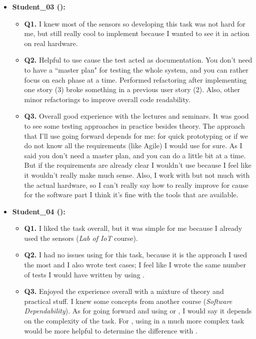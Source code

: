 \begin{itemize}
    \item \textbf{Student\_03 (\tdd):}
    \begin{itemize}
        \item \textbf{Q1.} I knew most of the sensors so developing this task was not hard for me, but still really cool to implement because I wanted to see it in action on real hardware.
        \item \textbf{Q2.} Helpful to use \tdd cause the test acted as documentation. You don't need to have a ``master plan" for testing the whole system, and you can rather focus on each phase at a time. Performed refactoring after implementing one story (3) broke something in a previous user story (2). Also, other minor refactorings to improve overall code readability.
        \item \textbf{Q3.} Overall good experience with the lectures and seminars. It was good to see some testing approaches in practice besides theory. The approach that I'll use going forward depends for me: for quick prototyping or if we do not know all the requirements (like Agile) I would use \tdd for sure. As I said you don't need a master plan, and you can do a little bit at a time. But if the requirements are already clear I wouldn't use \tdd because I feel like it wouldn't really make much sense. Also, I work with \ess but not much with the actual hardware, so I can't really say how to really improve \tdd for \ess cause for the software part I think it's fine with the tools that are available.
    \end{itemize}

    \item \textbf{Student\_04 (\tdd):}
    \begin{itemize}
        \item \textbf{Q1.} I liked the task overall, but it was simple for me because I already used the sensors (\textit{Lab of IoT} course). 
        \item \textbf{Q2.} I had no issues using \notdd for this task, because it is the approach I used the most and I also wrote test cases; I feel like I wrote the same number of tests I would have written by using \tdd.
        \item \textbf{Q3.} Enjoyed the experience overall with a mixture of theory and practical stuff. I knew some \tdd concepts from another course (\textit{Software Dependability}). As for \ess going forward and using \tdd or \notdd, I would say it depends on the complexity of the task. For \ess, using \tdd in a much more complex task would be more helpful to determine the difference with \notdd. 
    \end{itemize}


\end{itemize}
